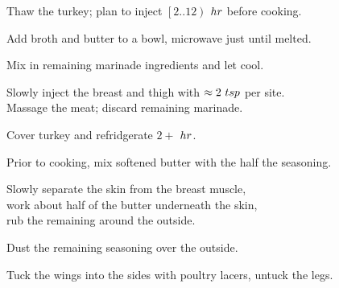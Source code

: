 \begin{preparation}
\item Thaw the turkey; plan to inject $\left[2..12\right)$ $\hour$ before cooking.
\item Add broth and butter to a bowl, microwave just until melted.
\item Mix in remaining marinade ingredients and let cool.
\item Slowly inject the breast and thigh with $\approx 2~\teaspoon$ per site.\\
	Massage the meat; discard remaining marinade.
\item Cover turkey and refridgerate $2\plus$ $\hour$.
\item Prior to cooking, mix softened butter with the half the seasoning.
\item Slowly separate the skin from the breast muscle,\\
	work about half of the butter underneath the skin,\\
	rub the remaining around the outside.
\item Dust the remaining seasoning over the outside.
\item Tuck the wings into the sides with poultry lacers, untuck the legs.
\end{preparation}


\recipeend%
